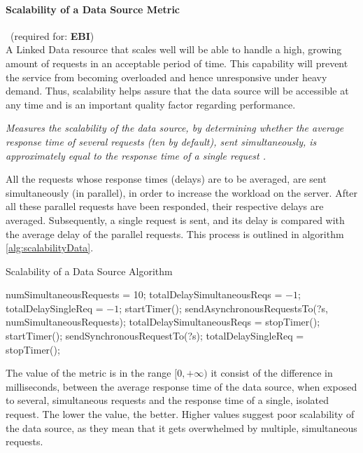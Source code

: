 

\paragraph{Scalability of a Data Source Metric}~(required for: \textbf{EBI}) ~\\ %
A Linked Data resource that scales well will be able to handle a high, growing amount of requests in an acceptable period of time. This capability will prevent the service from becoming overloaded and hence unresponsive under heavy demand. Thus, scalability helps assure  that the data source will be accessible at any time and is an important quality factor regarding performance.
\begin{mdframed}[style=metricdefinition]
\emph{Measures the scalability of the data source, by determining whether the average response time of several requests (ten by default), sent simultaneously, is approximately equal to the response time of a single request \cite{Flemming2008}.}
\end{mdframed}

All the requests whose response times (delays) are to be averaged, are sent simultaneously (in parallel), in order to increase the workload on the server. After all these parallel requests have been responded, their respective delays are averaged. Subsequently, a single request is sent, and its delay is compared with the average delay of the parallel requests. This process is outlined in algorithm \ref{alg:scalabilityData}.
\begin{algorithm}
\caption{Scalability of a Data Source Algorithm} \label{alg:scalabilityData}
\begin{algorithmic}[1]
\State numSimultaneousRequests = 10;
\State totalDelaySimultaneousReqs = $-1$;
\State totalDelaySingleReq = $-1$;
\EndProcedure
{}
\State startTimer();
\State sendAsynchronousRequestsTo(?s, numSimultaneousRequests);
\State totalDelaySimultaneousReqs = stopTimer();
\State startTimer();
\State sendSynchronousRequestTo(?s);
\State totalDelaySingleReq = stopTimer();
\EndIf
{}
\EndProcedure
\end{algorithmic}
\end{algorithm}
The value of the metric is in the range $[0, +\infty)$ it consist of the difference in milliseconds, between the average response time of the data source, when exposed to several, simultaneous requests and the response time of a single, isolated request. The lower the value, the better. Higher values suggest poor scalability of the data source, as they mean that it gets overwhelmed by multiple, simultaneous requests.


